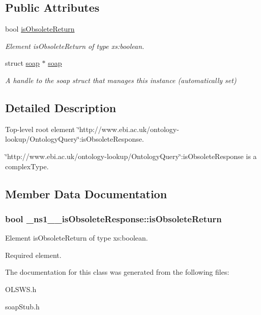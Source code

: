 \subsection*{Public Attributes}
\begin{DoxyCompactItemize}
\item 
bool \hyperlink{class__ns1____isObsoleteResponse_a7ad0fcaff6e386ac31bb118bced42a63}{isObsoleteReturn}
\begin{DoxyCompactList}\small\item\em Element isObsoleteReturn of type xs:boolean. \end{DoxyCompactList}\item 
\hypertarget{class__ns1____isObsoleteResponse_a0a8bd29f536318a189a2709d0b6667a7}{
struct \hyperlink{class__ns1____isObsoleteResponse_a0a8bd29f536318a189a2709d0b6667a7}{soap} $\ast$ \hyperlink{class__ns1____isObsoleteResponse_a0a8bd29f536318a189a2709d0b6667a7}{soap}}
\label{class__ns1____isObsoleteResponse_a0a8bd29f536318a189a2709d0b6667a7}

\begin{DoxyCompactList}\small\item\em A handle to the soap struct that manages this instance (automatically set) \end{DoxyCompactList}\end{DoxyCompactItemize}


\subsection{Detailed Description}
Top-\/level root element \char`\"{}http://www.ebi.ac.uk/ontology-\/lookup/OntologyQuery\char`\"{}:isObsoleteResponse. 

\char`\"{}http://www.ebi.ac.uk/ontology-\/lookup/OntologyQuery\char`\"{}:isObsoleteResponse is a complexType. 

\subsection{Member Data Documentation}
\hypertarget{class__ns1____isObsoleteResponse_a7ad0fcaff6e386ac31bb118bced42a63}{
\subsubsection[{isObsoleteReturn}]{\setlength{\rightskip}{0pt plus 5cm}bool {\bf \_\-ns1\_\-\_\-isObsoleteResponse::isObsoleteReturn}}}
\label{class__ns1____isObsoleteResponse_a7ad0fcaff6e386ac31bb118bced42a63}


Element isObsoleteReturn of type xs:boolean. 

Required element. 

The documentation for this class was generated from the following files:\begin{DoxyCompactItemize}
\item 
OLSWS.h\item 
soapStub.h\end{DoxyCompactItemize}
